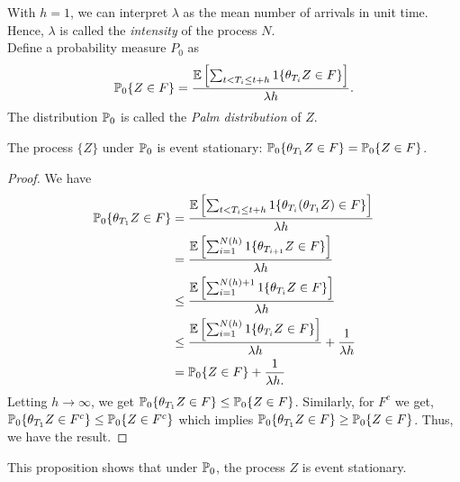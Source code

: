 \documentclass[all-lectures.tex]{subfiles}
\begin{document}
With $h=1$, we can interpret $\lambda$ as the mean number of arrivals in unit time. Hence, $\lambda$ is called the \textit{intensity }of the process $N$.\\
\indent Define a probability measure $P_0$ as 
\begin{align*}
\P_0\{Z \in F\} = \frac{\E\left[\sum_{t <T_i \leq t+h} 1\{ \theta_{T_i} Z \in F\}\right]}{\lambda h}.
\end{align*}
The distribution $\P_0$  is called the \textit{Palm distribution} of $Z$. 
\begin{prop}
The process $\{Z\}$ under $\P_0$ is event stationary: $\P_0\{\theta_{T_1} Z \in F\} = \P_0\{Z \in F\}$. 
\begin{proof}
We have 
\begin{align*}
\P_0\{\theta_{T_1} Z \in F\} &= \frac{\E\left[\sum_{t <T_i \leq t+h} 1\{ \theta_{T_i} (\theta_{T_1} Z) \in F\}\right]}{\lambda h} \\
&= \frac{\E\left[\sum_{i=1}^{N(h)} 1\{ \theta_{T_{i+1}} Z \in F\}\right]}{\lambda h} \\
&\leq \frac{\E\left[\sum_{i=1}^{N(h)+1} 1\{ \theta_{T_i} Z \in F\}\right]}{\lambda h} \\
&\leq \frac{\E\left[\sum_{i=1}^{N(h)} 1\{ \theta_{T_i} Z \in F\}\right]}{\lambda h} +\frac{1}{\lambda h}\\
&= \P_0\{Z \in F\} + \frac{1}{\lambda h.}
\end{align*}
Letting $h \to \infty$, we get $\P_0\{\theta_{T_1} Z \in F\} \leq \P_0\{Z \in F\}$. Similarly, for $F^c$ we get, $\P_0\{\theta_{T_1} Z \in F^c\} \leq \P_0\{Z \in F^c\}$ which implies $\P_0\{\theta_{T_1} Z \in F\} \geq \P_0\{Z \in F\}$. Thus, we have the result. 
\end{proof}
\end{prop}
This proposition shows that under $\P_0$, the process $Z$ is event stationary. \\
\end{document}
